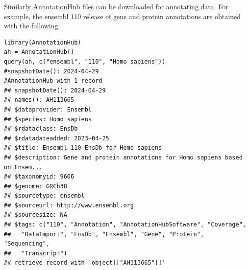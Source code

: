 \documentclass[graybox]{svmult}
\begin{document}
Similarly AnnotationHub files can be downloaded for annotating data. For example,
the ensembl 110 release of gene and protein annotations are obtained with the
following:

\begin{shaded}
\begin{verbatim}
library(AnnotationHub)
ah = AnnotationHub()
query(ah, c("ensembl", "110", "Homo sapiens"))
#snapshotDate(): 2024-04-29
#AnnotationHub with 1 record
## snapshotDate(): 2024-04-29
## names(): AH113665
## $dataprovider: Ensembl
## $species: Homo sapiens
## $rdataclass: EnsDb
## $rdatadateadded: 2023-04-25
## $title: Ensembl 110 EnsDb for Homo sapiens
## $description: Gene and protein annotations for Homo sapiens based on Ensem...
## $taxonomyid: 9606
## $genome: GRCh38
## $sourcetype: ensembl
## $sourceurl: http://www.ensembl.org
## $sourcesize: NA
## $tags: c("110", "Annotation", "AnnotationHubSoftware", "Coverage",
##   "DataImport", "EnsDb", "Ensembl", "Gene", "Protein", "Sequencing",
##   "Transcript") 
## retrieve record with 'object[["AH113665"]]' 
\end{verbatim}
\end{shaded}









%


\end{document}
